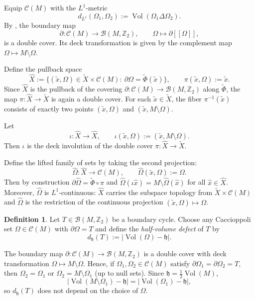 \documentclass[12pt,english]{article}
\theoremstyle{definition}
\newtheorem{definition}[theorem]{Definition}
\begin{document}
Equip $\mathcal C(M)$ with the $L^1$-metric
\[
d_{L^1}(\Omega_1,\Omega_2):=\operatorname{Vol}(\Omega_1\Delta\Omega_2).
\]
By \cite{MN2}, the boundary map
\[
\partial:\mathcal C(M)\longrightarrow \mathcal B(M,\mathbb{Z}_2),\qquad \Omega\longmapsto \partial[\![\Omega]\!],
\]
is a double cover. Its deck transformation is given by the complement map $\Omega\mapsto M\setminus\Omega$.

Define the pullback space
\[
\widehat X
:=\{(\tilde x,\Omega)\in \tilde X\times \mathcal C(M):\ \partial\Omega=\tilde \Phi(\tilde x)\},
\qquad
\pi(\tilde x,\Omega):=\tilde x.
\]
Since $\widehat X$ is the pullback of the covering $\partial:\mathcal C(M)\to\mathcal B(M,\mathbb{Z}_2)$ along $\tilde \Phi$, the map $\pi:\widehat X\to \tilde X$ is again a double cover. For each $\tilde x\in \tilde X$, the fiber $\pi^{-1}(\tilde x)$ consists of exactly two points $(\tilde x,\Omega)$ and $(\tilde x,M\setminus\Omega)$.

Let
\[
\iota:\widehat X\to\widehat X,
\qquad
\iota(\tilde x,\Omega):=(\tilde x,M\setminus\Omega).
\]
Then $\iota$ is the deck involution of the double cover $\pi:\widehat X\to\tilde X$.

Define the lifted family of sets by taking the second projection:
\[
\widehat\Omega:\widehat X\to \mathcal C(M),
\qquad
\widehat\Omega(\tilde x,\Omega):=\Omega.
\]
Then by construction $\partial\widehat\Omega=\tilde \Phi\circ \pi$ and $\widehat\Omega(\iota\hat x)=M\setminus \widehat\Omega(\hat x)$
for all $\hat x\in\widehat X$. Moreover, $\widehat\Omega$ is $L^1$-continuous: $\widehat X$ carries the subspace topology from $\tilde X\times\mathcal C(M)$ and $\widehat\Omega$ is the restriction of the continuous projection $(\tilde x,\Omega)\mapsto \Omega$.

\begin{definition}\label{def:dhv}
Let $T\in \mathcal B(M,\mathbb{Z}_2)$ be a boundary cycle. Choose any Caccioppoli set $\Omega\in \mathcal C(M)$ with $\partial\Omega=T$ and define the \emph{half-volume defect} of $T$ by
\[
d_{\mathfrak h}(T):=\bigl|\operatorname{Vol}(\Omega)-\mathfrak h\bigr|.
\]
\end{definition}

The boundary map $\partial:\mathcal C(M)\to \mathcal B(M,\mathbb{Z}_2)$ is a double cover with deck transformation $\Omega\mapsto M\setminus\Omega$. Hence, if $\Omega_1,\Omega_2\in\mathcal C(M)$ satisfy $\partial\Omega_1=\partial\Omega_2=T$, then $\Omega_2=\Omega_1$ or $\Omega_2=M\setminus\Omega_1$ (up to null sets). Since $\mathfrak h=\frac12\operatorname{Vol}(M)$,
\[
\bigl|\operatorname{Vol}(M\setminus\Omega_1)-\mathfrak h\bigr|=\bigl|\operatorname{Vol}(\Omega_1)-\mathfrak h\bigr|,
\]
so $d_{\mathfrak h}(T)$ does not depend on the choice of $\Omega$.
\end{document}
